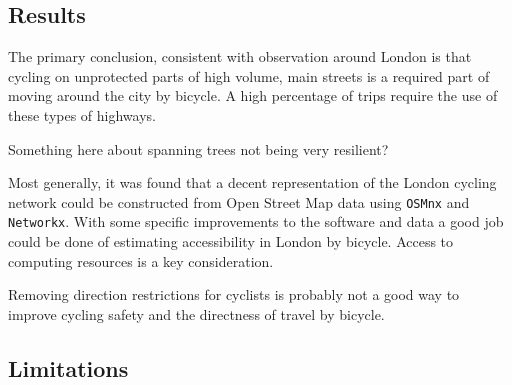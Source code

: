

%


\subsection{Results}	

The primary conclusion, consistent with observation around London is that cycling on unprotected parts of high volume, main streets is a required part of moving around the city by bicycle. A high percentage of trips require the use of these types of highways. 

Something here about spanning trees not being very resilient? 

Most generally, it was found that a decent representation of the London cycling network could be constructed from Open Street Map data using \texttt{OSMnx} and \texttt{Networkx}. With some specific improvements to the software and data a good job could be done of estimating accessibility in London by bicycle. Access to computing resources is a key consideration.

Removing direction restrictions for cyclists is probably not a good way to improve cycling safety and the directness of travel by bicycle. 

\subsection{Limitations}

